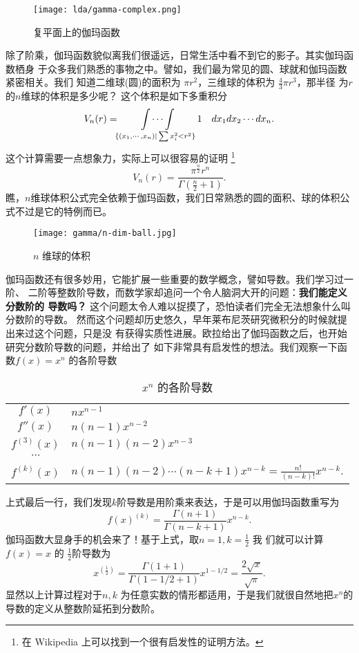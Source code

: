 {\begin{figure}[H]
\centering
\texttt{[image: lda/gamma-complex.png]}
\caption{复平面上的伽玛函数}
\end{figure}

除了阶乘，伽玛函数貌似离我们很遥远，日常生活中看不到它的影子。其实伽玛函数栖身
于众多我们熟悉的事物之中。譬如，我们最为常见的圆、球就和伽玛函数紧密相关。我们
知道二维球(圆)的面积为 $\pi r^2$，三维球的体积为 $\frac{4}{3} \pi r^3$，那半径
为$r$ 的$n$维球的体积是多少呢？ 这个体积是如下多重积分
$$ \displaystyle V_n(r) = \idotsint\limits_{ \tiny \{(x_1, \cdots, x_n) | \sum x_i^2 < r^2 \} }  1 \quad dx_1dx_2 \cdots dx_n  .$$
这个计算需要一点想象力，实际上可以很容易的证明 \footnote{在 Wikipedia 上可以找到一个很有启发性的证明方法。}
$$ V_n(r) = \frac{\pi^{\frac{n}{2}} r^n}{\Gamma(\frac{n}{2} + 1)} .$$ 
瞧，$n$维球体积公式完全依赖于伽玛函数，我们日常熟悉的圆的面积、球的体积公
式不过是它的特例而已。 

\begin{figure}[htbp]
\centering
\texttt{[image: gamma/n-dim-ball.jpg]}
\caption{$n$ 维球的体积}
\end{figure}


伽玛函数还有很多妙用，它能扩展一些重要的数学概念，譬如导数。我们学习过一阶、
二阶等整数阶导数，而数学家却追问一个令人脑洞大开的问题：{\bf 我们能定义分数阶的
导数吗？} 这个问题太令人难以捉摸了，恐怕读者们完全无法想象什么叫分数阶的导数。 
然而这个问题却历史悠久，早年莱布尼茨研究微积分的时候就提出来过这个问题，只是没
有获得实质性进展。欧拉给出了伽玛函数之后，也开始研究分数阶导数的问题，并给出了
如下非常具有启发性的想法。我们观察一下函数$f(x) = x^n$ 的各阶导数
\begin{table}[H]
\centering
\caption{$x^n$ 的各阶导数}
\begin{tabular*}{0.8\textwidth}{@{\extracolsep{\fill}}cl}
\\
$f'(x)$ & $nx^{n-1}$ \\
$f''(x)$ & $n(n-1)x^{n-2}$ \\
$f^{(3)}(x)$ & $n(n-1)(n-2)x^{n-3}$ \\
$\cdots$ &  \\
$f^{(k)}(x)$ & $n(n-1)(n-2)\cdots(n-k+1)x^{n-k} = \frac{n!}{(n-k)!} x^{n-k}$. 
\end{tabular*}
\end{table}
上式最后一行，我们发现$k$阶导数是用阶乘来表达，于是可以用伽玛函数重写为
$$ f(x)^{(k)} = \frac{\Gamma{(n+1)}}{\Gamma{(n-k+1)}} x^{n-k} .$$
伽玛函数大显身手的机会来了！基于上式，取$n=1, k=\frac{1}{2}$ 我
们就可以计算 $f(x)=x$ 的 $\frac{1}{2}$阶导数为
$$ x^{(\frac{1}{2})} = \frac{\Gamma{(1+1)}}{\Gamma{(1-1/2+1)}} x^{1-1/2} 
= \frac{2\sqrt{x}}{\sqrt{\pi}} .$$
显然以上计算过程对于$n, k$ 为任意实数的情形都适用，于是我们就很自然地把$x^n$的
导数的定义从整数阶延拓到分数阶。

}
